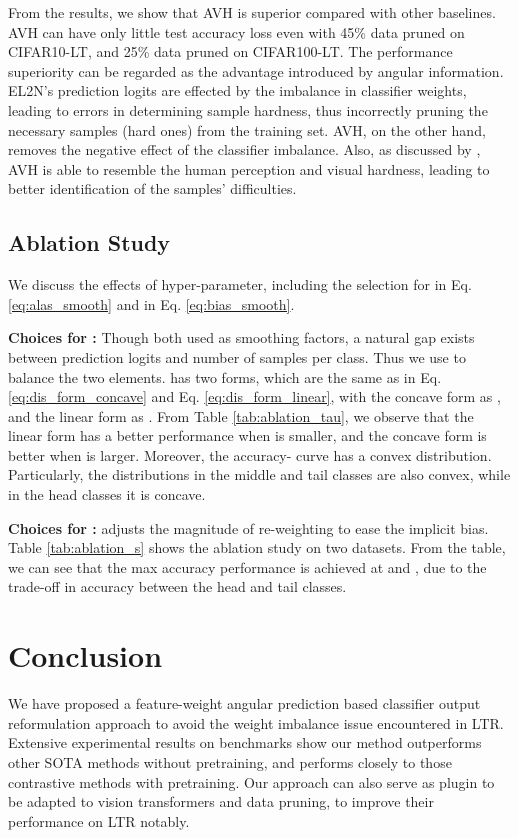 \documentclass[10pt,twocolumn,letterpaper]{article}
\begin{document}
From the results, we show that AVH is superior compared with other baselines. AVH can have only little test accuracy loss even with 45\% data pruned on CIFAR10-LT, and 25\% data pruned on CIFAR100-LT. The performance superiority can be regarded as the advantage introduced by angular information. EL2N's prediction logits are effected by the imbalance in classifier weights, leading to errors in determining sample hardness, thus incorrectly pruning the necessary samples (hard ones) from the training set. AVH, on the other hand, removes the negative effect of the classifier imbalance. Also, as discussed by \cite{avh}, AVH is able to resemble the human perception and visual hardness, leading to better identification of the samples' difficulties. 






\subsection{Ablation Study}
\label{sec:ab_study}
\vspace{-5pt}
We discuss the effects of hyper-parameter, including the selection for  in Eq. \ref{eq:alas_smooth} and  in Eq. \ref{eq:bias_smooth}.

\textbf{Choices for :} Though both used as smoothing factors, a natural gap exists between prediction logits and number of samples per class. Thus we use  to balance the two elements.  has two forms, which are the same as in Eq. \ref{eq:dis_form_concave} and Eq. \ref{eq:dis_form_linear}, with the concave form as , and the linear form as . From Table \ref{tab:ablation_tau}, we observe that the linear form has a better performance when  is smaller, and the concave form is better when  is larger. Moreover, the accuracy- curve has a convex distribution. Particularly, the distributions in the middle and tail classes are also convex, while in the head classes it is concave.

\textbf{Choices for :}  adjusts the magnitude of re-weighting to ease the implicit bias. Table \ref{tab:ablation_s} shows the ablation study on two datasets. From the table, we can see that the max accuracy performance is achieved at  and , due to the trade-off in accuracy between the head and tail classes. 


\section{Conclusion}
We have proposed a feature-weight angular prediction based classifier output reformulation approach to avoid the weight imbalance issue encountered in LTR. Extensive experimental results on benchmarks show our method outperforms other SOTA methods without pretraining, and performs closely to those contrastive methods with pretraining. Our approach can also serve as plugin to be adapted to vision transformers and data pruning, to improve their performance on LTR notably.
\end{document}
